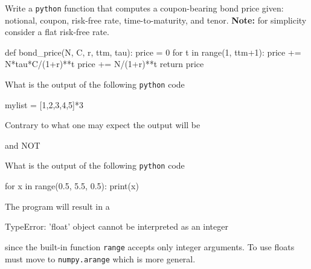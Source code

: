 \documentclass[12pt,a4paper]{exam}
\begin{document}
\begin{questions}
\question
Write a \texttt{python} function that computes a coupon-bearing bond price given: notional, coupon, risk-free rate, time-to-maturity, and tenor.
\textbf{Note:} for simplicity consider a flat risk-free rate.
\fillwithlines{3cm}
\begin{solution}
  \begin{ipython}
def bond_price(N, C, r, ttm, tau):
    price = 0
    for t in range(1, ttm+1):
        price += N*tau*C/(1+r)**t
    price += N/(1+r)**t
    return price    
    \end{ipython}
\end{solution}

\question
What is the output of the following \texttt{python} code

\begin{ipython}
mylist = [1,2,3,4,5]*3
\end{ipython}
\fillwithlines{3cm}
\begin{solution}
Contrary to what one may expect the output will be
\begin{ioutput}
[1,2,3,4,5,1,2,3,4,5,1,2,3,4,5]
\end{ioutput}
and NOT
\begin{ioutput}
[3,6,9,12,15]
\end{ioutput}
\end{solution}
\question
What is the output of the following \texttt{python} code

\begin{ipython}
for x in range(0.5, 5.5, 0.5):
    print(x)
\end{ipython}
\fillwithlines{3cm}
\begin{solution}
The program will result in a
\begin{ioutput}
TypeError: 'float' object cannot be interpreted as an integer
\end{ioutput}
since the built-in function \texttt{range} accepts only integer arguments. To use floats must move to \texttt{numpy.arange} which is more general.
\end{solution}

\end{questions}
\end{document}
